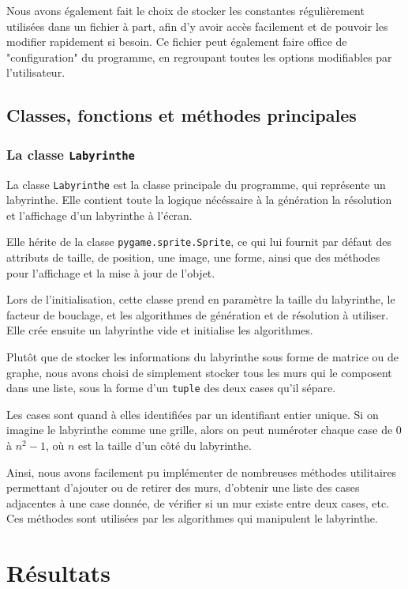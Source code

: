\documentclass[12pt]{scrreprt} %
\begin{document}
Nous avons également fait le choix de stocker les constantes régulièrement utilisées dans un fichier à part, afin d'y avoir accès facilement et de pouvoir les modifier rapidement si besoin. Ce fichier peut également faire office de "configuration" du programme, en regroupant toutes les options modifiables par l'utilisateur.

\section{Classes, fonctions et méthodes principales}

\subsection{La classe \texttt{Labyrinthe}}

La classe \texttt{Labyrinthe} est la classe principale du programme, qui représente un labyrinthe. Elle contient toute la logique nécéssaire à la génération la résolution et l'affichage d'un labyrinthe à l'écran.

Elle hérite de la classe \texttt{pygame.sprite.Sprite}, ce qui lui fournit par défaut des attributs de taille, de position, une image, une forme, ainsi que des méthodes pour l'affichage et la mise à jour de l'objet.

Lors de l'initialisation, cette classe prend en paramètre la taille du labyrinthe, le facteur de bouclage, et les algorithmes de génération et de résolution à utiliser. Elle crée ensuite un labyrinthe vide et initialise les algorithmes.

Plutôt que de stocker les informations du labyrinthe sous forme de matrice ou de graphe, nous avons choisi de simplement stocker tous les murs qui le composent dans une liste, sous la forme d'un \texttt{tuple} des deux cases qu'il sépare.

Les cases sont quand à elles identifiées par un identifiant entier unique. Si on imagine le labyrinthe comme une grille, alors on peut numéroter chaque case de $0$ à $n^2 - 1$, où $n$ est la taille d'un côté du labyrinthe.

Ainsi, nous avons facilement pu implémenter de nombreuses méthodes utilitaires permettant d'ajouter ou de retirer des murs, d'obtenir une liste des cases adjacentes à une case donnée, de vérifier si un mur existe entre deux cases, etc. Ces méthodes sont utilisées par les algorithmes qui manipulent le labyrinthe.




\chapter{Résultats}
\end{document}
